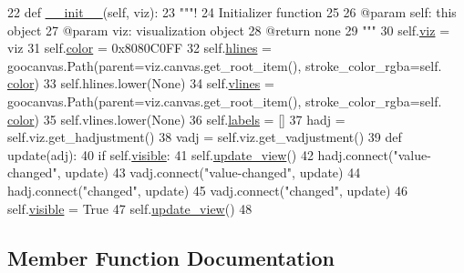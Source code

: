 \begin{DoxyCode}
22     \textcolor{keyword}{def }\hyperlink{classvisualizer_1_1hud_1_1Axes_a44c5f2890171f9a87d7be8c0a0d06c1c}{\_\_init\_\_}(self, viz):
23         \textcolor{stringliteral}{"""!}
24 \textcolor{stringliteral}{        Initializer function}
25 \textcolor{stringliteral}{        }
26 \textcolor{stringliteral}{        @param self: this object}
27 \textcolor{stringliteral}{        @param viz: visualization object}
28 \textcolor{stringliteral}{        @return none}
29 \textcolor{stringliteral}{        """}
30         self.\hyperlink{classvisualizer_1_1hud_1_1Axes_a2ef949d1777934b9f320356f5f78f250}{viz} = viz
31         self.\hyperlink{classvisualizer_1_1hud_1_1Axes_ad728f986aa77a67a9ac95ee7ce7f56a9}{color} = 0x8080C0FF
32         self.\hyperlink{classvisualizer_1_1hud_1_1Axes_a0cf5bfdbee64daf149fd3fcb26c7f662}{hlines} = goocanvas.Path(parent=viz.canvas.get\_root\_item(), stroke\_color\_rgba=self.
      \hyperlink{classvisualizer_1_1hud_1_1Axes_ad728f986aa77a67a9ac95ee7ce7f56a9}{color})
33         self.hlines.lower(\textcolor{keywordtype}{None})
34         self.\hyperlink{classvisualizer_1_1hud_1_1Axes_a31139415c2a30668137184f4ef88d948}{vlines} = goocanvas.Path(parent=viz.canvas.get\_root\_item(), stroke\_color\_rgba=self.
      \hyperlink{classvisualizer_1_1hud_1_1Axes_ad728f986aa77a67a9ac95ee7ce7f56a9}{color})
35         self.vlines.lower(\textcolor{keywordtype}{None})
36         self.\hyperlink{classvisualizer_1_1hud_1_1Axes_a8f7a1ac8f65e14502dfb45b127b7b9df}{labels} = []
37         hadj = self.viz.get\_hadjustment()
38         vadj = self.viz.get\_vadjustment()
39         \textcolor{keyword}{def }update(adj):
40             \textcolor{keywordflow}{if} self.\hyperlink{classvisualizer_1_1hud_1_1Axes_ae1618ac7b34eb439fb93ec44f6b55347}{visible}:
41                 self.\hyperlink{classvisualizer_1_1hud_1_1Axes_aa14ec1cc14c11d259fea914a9dd23fb8}{update\_view}()
42         hadj.connect(\textcolor{stringliteral}{"value-changed"}, update)
43         vadj.connect(\textcolor{stringliteral}{"value-changed"}, update)
44         hadj.connect(\textcolor{stringliteral}{"changed"}, update)
45         vadj.connect(\textcolor{stringliteral}{"changed"}, update)
46         self.\hyperlink{classvisualizer_1_1hud_1_1Axes_ae1618ac7b34eb439fb93ec44f6b55347}{visible} = \textcolor{keyword}{True}
47         self.\hyperlink{classvisualizer_1_1hud_1_1Axes_aa14ec1cc14c11d259fea914a9dd23fb8}{update\_view}()
48 
\end{DoxyCode}


\subsection{Member Function Documentation}

